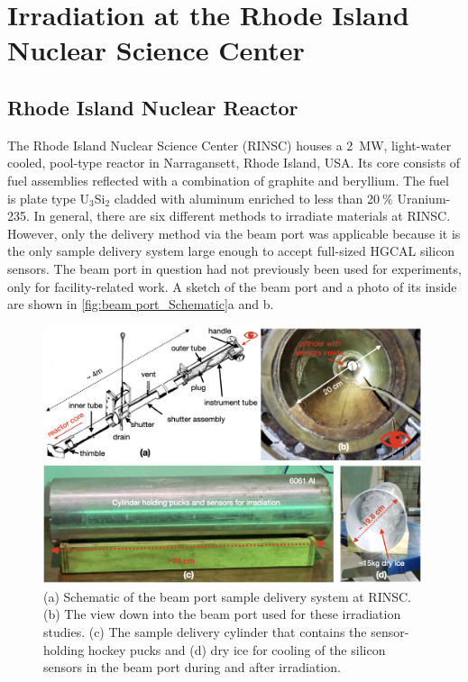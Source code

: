 \section{Irradiation at the Rhode Island Nuclear Science Center}
\label{sec:irradiation}

\subsection{Rhode Island Nuclear Reactor}
\label{subsec:RINSC}
The Rhode Island Nuclear Science Center (RINSC) houses a \SI{2}{\mega\watt}, light-water cooled, pool-type reactor in Narragansett, Rhode Island, USA.
Its core consists of fuel assemblies reflected with a combination of graphite and beryllium.
The fuel is plate type U$_3$Si$_2$ cladded with aluminum enriched to less than 20$~\%$ Uranium-235.
In general, there are six different methods to irradiate materials at RINSC.
However, only the delivery method via the beam port was applicable because it is the only sample delivery system large enough to accept full-sized HGCAL silicon sensors.
The beam port in question had not previously been used for experiments, only for facility-related work.
A sketch of the beam port and a photo of its inside are shown in \ref{fig:beam port_Schematic}a and b.
\begin{figure}[!hbt]
  \begin{center}
    \includegraphics[width=0.99\textwidth]{figures/figures_edited_001.jpeg}
    \caption{(a) Schematic of the beam port sample delivery system at RINSC.
    (b) The view down into the beam port used for these irradiation studies.
    (c) The sample delivery cylinder that contains the sensor-holding hockey pucks and (d) dry ice for cooling of the silicon sensors in the beam port during and after irradiation.
    }
    \label{fig:Beamport_Schematic}
  \end{center}
\end{figure}
